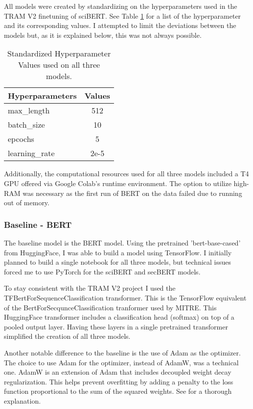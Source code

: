\documentclass[11pt]{article}
\begin{document}
All models were created by standardizing on the hyperparameters used in the TRAM V2 finetuning of sciBERT. See Table \ref{tab:hyperparameters} for a list of the hyperparameter and its corresponding values. I attempted to limit the deviations between the models but, as it is explained below, this was not always possible. 

\begin{table}[h]
\centering
\begin{tabular}{lc}
\hline
\rowcolor[HTML]{C0C0C0} 
\textbf{Hyperparameters} & \textbf{Values} \\ \hline
max\_length & 512 \\
batch\_size & 10 \\
epcochs & 5 \\
learning\_rate & 2e-5 \\ \hline
\end{tabular}

\caption{Standardized Hyperparameter Values used on all three models.}
\label{tab:hyperparameters}
\end{table}

Additionally, the computational resources used for all three models included a T4 GPU offered via Google Colab's runtime environment. The option to utilize high-RAM was necessary as the first run of BERT on the data failed due to running out of memory.

\subsubsection{Baseline - BERT}
The baseline model is the BERT model. Using the pretrained 'bert-base-cased' from HuggingFace, I was able to build a model using TensorFlow. I initially planned to build a single notebook for all three models, but technical issues forced me to use PyTorch for the sciBERT and secBERT models.

To stay consistent with the TRAM V2 project I used the TFBertForSequenceClassification transformer. This is the TensorFlow equivalent of the BertForSecqunceClassification tranformer used by MITRE. This HuggingFace transformer includes a classification head (softmax) on top of a pooled output layer. Having these layers in a single pretrained transformer simplified the creation of all three models. 

Another notable difference to the baseline is the use of Adam as the optimizer. The choice to use Adam for the optimizer, instead of AdamW, was a technical one. AdamW is an extension of Adam that includes decoupled weight decay regularization. This helps prevent overfitting by adding a penalty to the loss function proportional to the sum of the squared weights. See \cite{loshchilov2017decoupled} for a thorough explanation.
\end{document}
